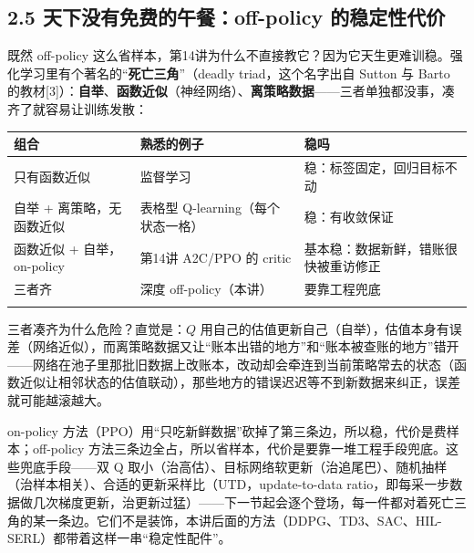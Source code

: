 \documentclass[
  chinese,
]{ctexart}
\begin{document}
\subsection{2.5 天下没有免费的午餐：off-policy
的稳定性代价}\label{ux5929ux4e0bux6ca1ux6709ux514dux8d39ux7684ux5348ux9910off-policy-ux7684ux7a33ux5b9aux6027ux4ee3ux4ef7}

既然 off-policy
这么省样本，第14讲为什么不直接教它？因为它天生更难训稳。强化学习里有个著名的``\textbf{死亡三角}''（deadly
triad，这个名字出自 Sutton 与 Barto
的教材{[}3{]}）：\textbf{自举}、\textbf{函数近似}（神经网络）、\textbf{离策略数据}------三者单独都没事，凑齐了就容易让训练发散：

\begin{center}
\begin{tabular}{@{}>{\raggedright\arraybackslash}p{} >{\raggedright\arraybackslash}p{} >{\raggedright\arraybackslash}p{}@{}}
\toprule\noalign{}
组合 & 熟悉的例子 & 稳吗 \\
\midrule\noalign{}
只有函数近似 & 监督学习 & 稳：标签固定，回归目标不动 \\
自举 + 离策略，无函数近似 & 表格型 Q-learning（每个状态一格） & 稳：有收敛保证 \\
函数近似 + 自举，on-policy & 第14讲 A2C/PPO 的 critic & 基本稳：数据新鲜，错账很快被重访修正 \\
三者齐 & 深度 off-policy（本讲） & 要靠工程兜底 \\
\bottomrule\noalign{}
\end{tabular}
\end{center}

三者凑齐为什么危险？直觉是：\(Q\)
用自己的估值更新自己（自举），估值本身有误差（网络近似），而离策略数据又让``账本出错的地方''和``账本被查账的地方''错开------网络在池子里那批旧数据上改账本，改动却会牵连到当前策略常去的状态（函数近似让相邻状态的估值联动），那些地方的错误迟迟等不到新数据来纠正，误差就可能越滚越大。

on-policy
方法（PPO）用``只吃新鲜数据''砍掉了第三条边，所以稳，代价是费样本；off-policy
方法三条边全占，所以省样本，代价是要靠一堆工程手段兜底。这些兜底手段------双
Q
取小（治高估）、目标网络软更新（治追尾巴）、随机抽样（治样本相关）、合适的更新采样比（UTD，update-to-data
ratio，即每采一步数据做几次梯度更新，治更新过猛）------下一节起会逐个登场，每一件都对着死亡三角的某一条边。它们不是装饰，本讲后面的方法（DDPG、TD3、SAC、HIL-SERL）都带着这样一串``稳定性配件''。
\end{document}

